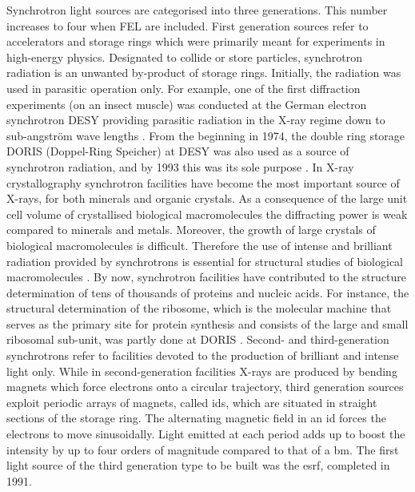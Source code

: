 \documentclass[
twoside,
openright,
titlepage,
numbers=noenddot,
headinclude,
fleqn,
a4paper,
footinclude=true,
cleardoublepage=empty,
abstractoff,
BCOR=5mm,
paper=a4,
fontsize=11pt,
british,ngerman,american,
]{scrreprt}
\begin{document}
Synchrotron light sources are categorised into three generations.
This number increases to four when \ac{FEL} are included.  First
generation sources refer to accelerators and storage rings which were
primarily meant for experiments in high-energy physics.  Designated to
collide or store particles, synchrotron radiation is an unwanted
by-product of storage rings.  Initially, the radiation was used in
parasitic operation only.  %
For example, one of the first diffraction experiments (on an insect
muscle) was conducted at the German electron synchrotron \acs{DESY}
providing parasitic radiation in the X-ray regime down to sub-angström
wave lengths \cite{Rosenbaum1971,XDB}.
From the beginning in 1974, the double ring storage DORIS (Doppel-Ring
Speicher) at \ac{DESY} was also used as a source of synchrotron
radiation, and by 1993 this was its sole purpose \cite{XDB}.  In X-ray
crystallography synchrotron facilities have become the most important
source of X-rays, for both minerals and organic crystals.  As a
consequence of the large unit cell volume of crystallised biological
macromolecules the diffracting power is weak compared to minerals and
metals.  Moreover, the growth of large crystals of biological
macromolecules is difficult.  Therefore the use of  intense and
brilliant radiation provided by synchrotrons is essential for
structural studies of biological macromolecules \cite{Lindley1995}.
By now, synchrotron facilities have contributed to the structure
determination of tens of thousands of proteins and nucleic acids.  For
instance, the structural determination of the ribosome, which is the
molecular machine that serves as the primary site for protein
synthesis and consists of the large and small ribosomal sub-unit, was
partly done at DORIS \cite{Yonath2000,Yonath2001}.  Second- and
third-generation synchrotrons refer to facilities devoted to the
production of brilliant and intense light only.  While in
second-generation facilities X-rays are produced by bending magnets
which force electrons onto a circular trajectory, third generation
sources exploit periodic arrays of magnets, called \acfp{id}, which
are situated in straight sections of the storage ring.  The
alternating magnetic field in an \acl{id} forces the electrons to move
sinusoidally.  Light emitted at each period adds up to boost the
intensity by up to four orders of magnitude compared to that of a
\acf{bm}.  %
The first light source of the third generation type to be built was
the \ac{esrf}, completed in 1991.
\end{document}
